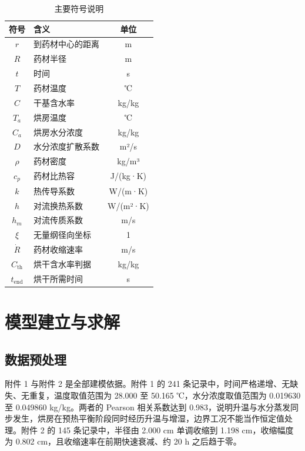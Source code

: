 \documentclass[12pt,a4paper]{article}
\begin{document}
\begin{table}[H]
    \centering
    \caption{主要符号说明}
    \begin{tabular}{clc}
        \toprule
        符号 & 含义 & 单位 \\
        \midrule
        $r$ & 到药材中心的距离 & m \\
        $R$ & 药材半径 & m \\
        $t$ & 时间 & s \\
        $T$ & 药材温度 & ℃ \\
        $C$ & 干基含水率 & kg/kg \\
        $T_a$ & 烘房温度 & ℃ \\
        $C_a$ & 烘房水分浓度 & kg/kg \\
        $D$ & 水分浓度扩散系数 & m²/s \\
        $\rho$ & 药材密度 & kg/m³ \\
        $c_p$ & 药材比热容 & J/(kg·K) \\
        $k$ & 热传导系数 & W/(m·K) \\
        $h$ & 对流换热系数 & W/(m²·K) \\
        $h_m$ & 对流传质系数 & m/s \\
        $\xi$ & 无量纲径向坐标 & 1 \\
        $\dot R$ & 药材收缩速率 & m/s \\
        $C_{\mathrm{th}}$ & 烘干含水率判据 & kg/kg \\
        $t_{\mathrm{end}}$ & 烘干所需时间 & s \\
        \bottomrule
    \end{tabular}
\end{table}

\section{模型建立与求解}

\subsection{数据预处理}

附件 1 与附件 2 是全部建模依据。附件 1 的 241 条记录中，时间严格递增、无缺失、无重复，温度取值范围为 28.000 至 50.165 ℃，水分浓度取值范围为 0.019630 至 0.049860 kg/kg。两者的 Pearson 相关系数达到 0.983，说明升温与水分蒸发同步发生，烘房在预热平衡阶段同时经历升温与增湿，边界工况不能当作恒定值处理。附件 2 的 145 条记录中，半径由 2.000 cm 单调收缩到 1.198 cm，收缩幅度为 0.802 cm，且收缩速率在前期快速衰减、约 20 h 之后趋于零。
\end{document}
